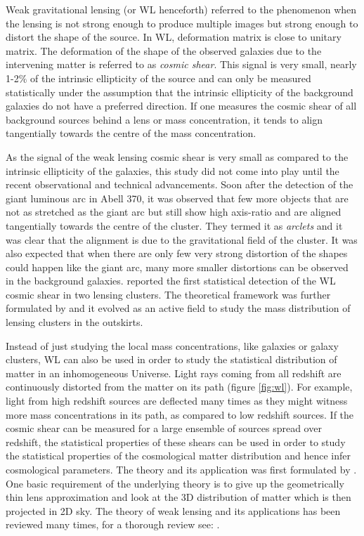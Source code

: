 Weak gravitational lensing (or WL henceforth) referred to the phenomenon when 
the lensing is not strong enough to produce multiple images but strong enough
to distort the shape of the source. In WL, deformation matrix is close
to unitary matrix.
The deformation of the shape of the observed galaxies
due to the intervening matter is referred to as {\it cosmic shear}. This
signal is very small, nearly 1-2$\%$ of the intrinsic ellipticity of the source 
and can only be measured statistically under the assumption that the intrinsic 
ellipticity of the background galaxies do not have a preferred direction. If one 
measures the cosmic shear of all background sources behind a lens or mass concentration,
it tends to align tangentially towards the centre of the mass concentration. 

As the signal of the weak lensing cosmic shear is very small as compared to the 
intrinsic ellipticity of the galaxies, this study did not come into play until
the recent observational and technical advancements. Soon 
after the detection of the giant luminous arc in Abell 370, it was observed
that few more objects that are not as stretched as the giant arc but still show
high axis-ratio and are aligned tangentially towards the centre of the cluster. They
termed it as {\it arclets} and it was clear that the alignment is due to the 
gravitational field of the cluster. It was also expected that when there are
only few very strong distortion of the shapes could happen like the giant 
arc, many more smaller distortions can be observed in the background galaxies.
\cite{1990ApJ...349L...1T} reported the first statistical detection of the WL
cosmic shear in two lensing clusters. The theoretical framework was further
formulated by \cite{1993ApJ...404..441K} and it evolved as an active field
to study the mass distribution of lensing clusters in the outskirts. 

Instead of just studying the local mass concentrations, like galaxies or galaxy
clusters, WL can also be used in order to study the statistical distribution of matter
in an inhomogeneous Universe. Light rays coming from all redshift are continuously
distorted from the matter on its path (figure \ref{fig:wl}). 
For example, light from high redshift sources
are deflected many times as they might witness more mass concentrations in its path, 
as compared to low redshift sources. If the cosmic shear can be measured for 
a large ensemble of sources spread over redshift, the statistical properties
of these shears can be used in order to study the statistical properties of the
cosmological matter distribution and hence infer cosmological parameters. The 
theory and its application was first formulated by \cite{1991MNRAS.251..600B}.
One basic requirement of the underlying theory is to give up the geometrically
thin lens approximation and look at the 3D distribution of matter which 
is then projected in 2D sky. The theory of weak lensing and its applications
has been reviewed many times, for a thorough review see: \cite{}.

